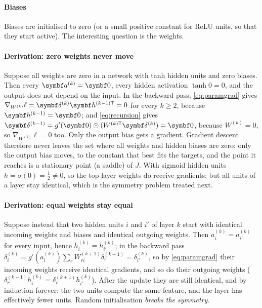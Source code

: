 \documentclass[11pt]{article}
\newcommand{\av}{\vect{a}}
\newcommand{\hv}{\vect{h}}
\newcommand{\dv}{\vect{\delta}}
\begin{document}
\paragraph{Biases} Biases are initialised to zero (or a small positive constant for ReLU units, so that they start
active). The interesting question is the weights.

\paragraph{Derivation: zero weights never move} Suppose all weights are zero in a network with tanh hidden
units and zero biases. Then every $\av^{(k)} = \vect{0}$, every hidden activation $\tanh 0 = 0$, and the output does not
depend on the input. In the backward pass, \eqref{eq:paramgrad} gives $\nabla_{W^{(k)}}\ell = \dv^{(k)}\hv^{(k-1)\mathsf{T}} =
0$ for every $k \ge 2$, because $\hv^{(k-1)} = \vect{0}$; and \eqref{eq:recursion} gives $\dv^{(k-1)} = g'(\vect{0}) \odot
(W^{(k)\mathsf{T}}\dv^{(k)}) = \vect{0}$, because $W^{(k)} = 0$, so $\nabla_{W^{(1)}}\ell = 0$ too. Only the output bias
gets a gradient. Gradient descent therefore never leaves the set where all weights and hidden biases are zero: only the
output bias moves, to the constant that best fits the targets, and the point it reaches is a stationary point (a saddle)
of $J$. With sigmoid hidden units $h = \sigma(0) = \frac12 \neq 0$, so the top-layer weights do receive gradients; but
all units of a layer stay identical, which is the symmetry problem treated next.

\paragraph{Derivation: equal weights stay equal} Suppose instead that two hidden units $i$ and $i'$ of layer $k$ start
with identical incoming weights and biases and identical outgoing weights. Then $a^{(k)}_i = a^{(k)}_{i'}$ for every
input, hence $h^{(k)}_i = h^{(k)}_{i'}$; in the backward pass $\delta^{(k)}_i = g'(a^{(k)}_i)\sum_r W^{(k+1)}_{ri}
\delta^{(k+1)}_r = \delta^{(k)}_{i'}$, so by \eqref{eq:paramgrad} their incoming weights receive identical gradients,
and so do their outgoing weights ($\delta^{(k+1)}_rh^{(k)}_i = \delta^{(k+1)}_rh^{(k)}_{i'}$). After the update they are
still identical, and by induction forever: the two units compute the same feature, and the layer has effectively
fewer units. Random initialisation \emph{breaks the symmetry}.
\end{document}
